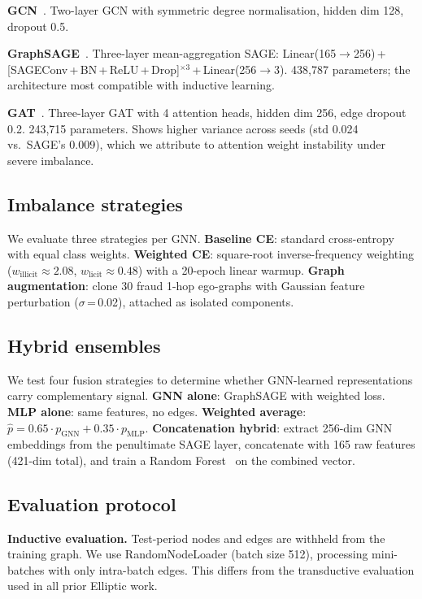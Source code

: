 \documentclass[11pt]{article}
\begin{document}
\textbf{GCN}~\citep{kipf2017}.  Two-layer GCN with symmetric degree
normalisation, hidden dim 128, dropout 0.5.

\textbf{GraphSAGE}~\citep{hamilton2017}.  Three-layer
mean-aggregation SAGE:
Linear(165$\!\to\!$256)\,+\,[SAGEConv\,+\,BN\,+\,ReLU\,+\,Drop]$^{\times3}$\,+\,Linear(256$\!\to\!$3).
438,787 parameters; the architecture most compatible with inductive
learning.

\textbf{GAT}~\citep{velickovic2018}.  Three-layer GAT with 4
attention heads, hidden dim 256, edge dropout 0.2.  243,715
parameters.  Shows higher variance across seeds (std 0.024 vs.\
SAGE's 0.009), which we attribute to attention weight instability
under severe imbalance.

\subsection{Imbalance strategies}

We evaluate three strategies per GNN.  \textbf{Baseline CE}:
standard cross-entropy with equal class weights.  \textbf{Weighted
CE}: square-root inverse-frequency weighting
($w_\text{illicit}\!\approx\!2.08$, $w_\text{licit}\!\approx\!0.48$)
with a 20-epoch linear warmup.  \textbf{Graph augmentation}: clone
30 fraud 1-hop ego-graphs with Gaussian feature perturbation
($\sigma$\,=\,0.02), attached as isolated components.

\subsection{Hybrid ensembles}

We test four fusion strategies to determine whether GNN-learned
representations carry complementary signal.
\textbf{GNN alone}: GraphSAGE with weighted loss.
\textbf{MLP alone}: same features, no edges.
\textbf{Weighted average}:
$\hat{p} = 0.65 \cdot p_\text{GNN} + 0.35 \cdot p_\text{MLP}$.
\textbf{Concatenation hybrid}: extract 256-dim GNN embeddings from
the penultimate SAGE layer, concatenate with 165 raw features
(421-dim total), and train a Random
Forest~\citep{breiman2001rf} on the combined vector.

\subsection{Evaluation protocol}

\textbf{Inductive evaluation.}  Test-period nodes and edges are
withheld from the training graph.  We use RandomNodeLoader (batch
size 512), processing mini-batches with only intra-batch edges.
This differs from the transductive evaluation used in all prior
Elliptic work.
\end{document}
